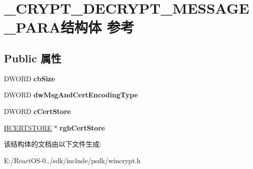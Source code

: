 \hypertarget{struct___c_r_y_p_t___d_e_c_r_y_p_t___m_e_s_s_a_g_e___p_a_r_a}{}\section{\+\_\+\+C\+R\+Y\+P\+T\+\_\+\+D\+E\+C\+R\+Y\+P\+T\+\_\+\+M\+E\+S\+S\+A\+G\+E\+\_\+\+P\+A\+R\+A结构体 参考}
\label{struct___c_r_y_p_t___d_e_c_r_y_p_t___m_e_s_s_a_g_e___p_a_r_a}
\subsection*{Public 属性}
\begin{DoxyCompactItemize}
\item 
\mbox{\label{struct___c_r_y_p_t___d_e_c_r_y_p_t___m_e_s_s_a_g_e___p_a_r_a_a53c19f51f3dbad6924dfb253af2a887e}} 
D\+W\+O\+RD {\bfseries cb\+Size}
\item 
\mbox{\label{struct___c_r_y_p_t___d_e_c_r_y_p_t___m_e_s_s_a_g_e___p_a_r_a_a12819a92d49bf4bb82acab1c6fbab232}} 
D\+W\+O\+RD {\bfseries dw\+Msg\+And\+Cert\+Encoding\+Type}
\item 
\mbox{\label{struct___c_r_y_p_t___d_e_c_r_y_p_t___m_e_s_s_a_g_e___p_a_r_a_ae1d5bbdd4848ea2801b22622a8dcca1d}} 
D\+W\+O\+RD {\bfseries c\+Cert\+Store}
\item 
\mbox{\label{struct___c_r_y_p_t___d_e_c_r_y_p_t___m_e_s_s_a_g_e___p_a_r_a_a3f15fa422b652c3b963b87fd6e4092f7}} 
\hyperlink{interfacevoid}{H\+C\+E\+R\+T\+S\+T\+O\+RE} $\ast$ {\bfseries rgh\+Cert\+Store}
\end{DoxyCompactItemize}


该结构体的文档由以下文件生成\+:\begin{DoxyCompactItemize}
\item 
E\+:/\+React\+O\+S-\/0../sdk/include/psdk/wincrypt.\+h\end{DoxyCompactItemize}
